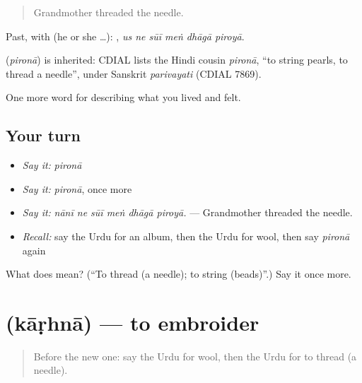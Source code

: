 \begin{quote}
Grandmother threaded the needle.
\end{quote}

Past, with  (he or she …):      , \emph{us ne sūī meṅ dhāgā piroyā}.

\begin{cousinweb}
\textbf{} (\emph{pironā}) is inherited: CDIAL lists the Hindi cousin \emph{pironā}, \textquotedblleft{}to string pearls, to thread a needle\textquotedblright{}, under Sanskrit \emph{parivayati} (CDIAL 7869).
\end{cousinweb}

\begin{grammarlens}[title={What you've built}]
One more word for describing what you lived and felt.
\end{grammarlens}

\subsection*{Your turn}
\begin{itemize}
\raggedright
  \item \emph{Say it:} \emph{pironā}
  \item \emph{Say it:} \emph{pironā}, once more
  \item \emph{Say it:} \emph{nānī ne sūī meṅ dhāgā piroyā.} — Grandmother threaded the needle.
  \item \emph{Recall:} say the Urdu for an album, then the Urdu for wool, then say \emph{pironā} again
\end{itemize}

\begin{tcolorbox}[breakable,colback=teal!4,colframe=teal!35!black,title={Before you move on}]
What does  mean? (\textquotedblleft{}To thread (a needle); to string (beads)\textquotedblright{}.) Say it once more.
\end{tcolorbox}
\section[\texorpdfstring{\ur{کاڑھنا} (kāṛhnā)}{کاڑھنا (kāṛhnā)}]{ (kāṛhnā) — to embroider}

\label{lesson:UR-C514-karhna}



\begin{quote}
Before the new one: say the Urdu for wool, then the Urdu for to thread (a needle).
\end{quote}

